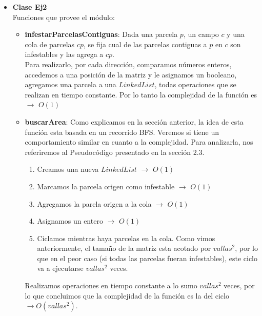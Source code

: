 \begin{itemize}
\begin{itemize}
\end{itemize}

\item \textbf{Clase Ej2}\\
\indent Funciones que provee el módulo:
\begin{itemize}
 \item \textbf{infestarParcelasContiguas}: Dada una parcela $p$, un campo $c$ y
una cola de parcelas $cp$, se fija cual de las parcelas contiguas a $p$ en $c$
son infestables y las agrega a $cp$. \\
Para realizarlo, por cada dirección, comparamos números enteros, accedemos a una
posición de la matriz y le asignamos un booleano, agregamos una parcela a una
$LinkedList$, todas operaciones que se realizan en tiempo constante. Por lo
tanto la complejidad de la función es $\rightarrow$ $O(1)$
\item \textbf{buscarArea}: Como explicamos en la sección anterior, la idea de
esta función esta basada en un recorrido BFS. Veremos si tiene un
comportamiento similar en cuanto a la complejidad. Para analizarla, nos
referiremos al Pseudocódigo presentado en la sección 2.3.
\begin{enumerate}
 \item Creamos una nueva $LinkedList$ $\rightarrow$ $O(1)$
 \item Marcamos la parcela origen como infestable $\rightarrow$ $O(1)$
 \item Agregamos la parela origen a la cola $\rightarrow$ $O(1)$
 \item Asignamos un entero $\rightarrow$ $O(1)$
 \item Ciclamos mientras haya parcelas en la cola. Como vimos anteriormente, el
tamaño de la matriz esta acotado por $vallas^2$, por lo que en el peor caso (si todas las parcelas fueran infestables),
este ciclo va a ejecutarse $vallas^2$ veces.
\end{enumerate}

Realizamos operaciones en tiempo constante a lo sumo $vallas^2$ veces, por lo
que concluimos que la complejidad de la función es la del ciclo $\rightarrow O(vallas^2)$.


\end{itemize}
\end{itemize}
